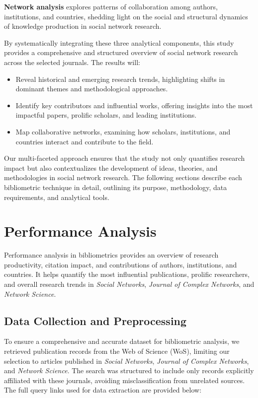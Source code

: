 \documentclass[twocolumn]{article}
\begin{document}
	\textbf{Network analysis} explores patterns of collaboration among authors, institutions, and countries, shedding light on the social and structural dynamics of knowledge production in social network research.
	
	By systematically integrating these three analytical components, this study provides a comprehensive and structured overview of social network research across the selected journals. The results will:
	
	\begin{itemize}
		\item Reveal historical and emerging research trends, highlighting shifts in dominant themes and methodological approaches.
		\item Identify key contributors and influential works, offering insights into the most impactful papers, prolific scholars, and leading institutions.
		\item Map collaborative networks, examining how scholars, institutions, and countries interact and contribute to the field.
	\end{itemize}
	
	Our multi-faceted approach ensures that the study not only quantifies research impact but also contextualizes the development of ideas, theories, and methodologies in social network research. The following sections describe each bibliometric technique in detail, outlining its purpose, methodology, data requirements, and analytical tools.
	
	\section{Performance Analysis}\label{Performance Analysis}
	
	Performance analysis in bibliometrics provides an overview of research productivity, citation impact, and contributions of authors, institutions, and countries. It helps quantify the most influential publications, prolific researchers, and overall research trends in \textit{Social Networks}, \textit{Journal of Complex Networks}, and \textit{Network Science}.
	
	\subsection{Data Collection and Preprocessing}
	
	To ensure a comprehensive and accurate dataset for bibliometric analysis, we retrieved publication records from the Web of Science (WoS), limiting our selection to articles published in \textit{Social Networks}, \textit{Journal of Complex Networks}, and \textit{Network Science}. The search was structured to include only records explicitly affiliated with these journals, avoiding misclassification from unrelated sources. The full query links used for data extraction are provided below:
	
\end{document}
